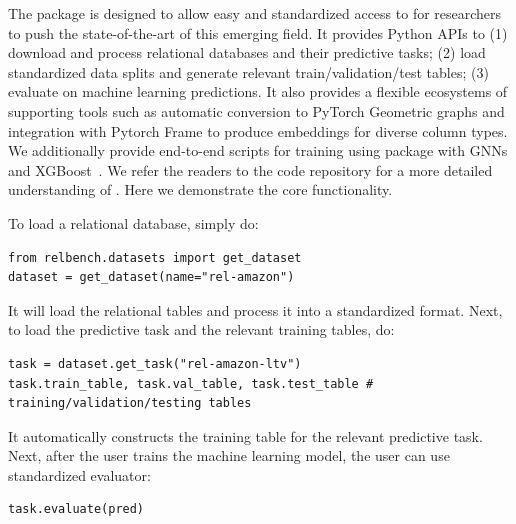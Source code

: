 The \BenchmarkName package is designed to allow easy and standardized access to \AreaName for researchers to push the state-of-the-art of this emerging field. It provides Python APIs to (1) download and process relational databases and their predictive tasks; (2) load standardized data splits and generate relevant train/validation/test tables; (3) evaluate on machine learning predictions. It also provides a flexible ecosystems of supporting tools such as automatic conversion to PyTorch Geometric graphs and integration with Pytorch Frame to produce embeddings for diverse column types. We additionally provide end-to-end scripts for training using \BenchmarkName package with GNNs and XGBoost~\citep{chen2016xgboost}. We refer the readers to the code repository for a more detailed understanding of \BenchmarkName. Here we demonstrate the core functionality. 


To load a relational database, simply do:

\vspace{-3mm}
\begin{verbatim}
from relbench.datasets import get_dataset
dataset = get_dataset(name="rel-amazon")
\end{verbatim}
\vspace{-3mm}

It will load the relational tables and process it into a standardized format. Next, to load the predictive task and the relevant training tables, do:

\vspace{-3mm}
\begin{verbatim}
task = dataset.get_task("rel-amazon-ltv")
task.train_table, task.val_table, task.test_table # training/validation/testing tables
\end{verbatim}
\vspace{-3mm}

It automatically constructs the training table for the relevant predictive task. Next, after the user trains the machine learning model, the user can use \BenchmarkName standardized evaluator:
\vspace{-3mm}
\begin{verbatim}
task.evaluate(pred)
\end{verbatim}
\vspace{-3mm}


